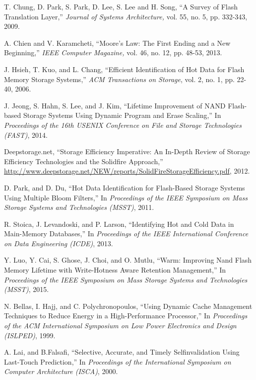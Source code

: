 \begin{thebibliography}{00}
T. Chung, D. Park, S. Park, D. Lee, S. Lee and H. Song,
``A Survey of Flash Translation Layer,''
\emph{Journal of Systems Architecture,} vol. 55, no. 5, pp. 332-343, 2009.

A. Chien and V. Karamcheti,
``Moore's Law: The First Ending and a New Beginning,''
\emph{IEEE Computer Magazine,} vol. 46, no. 12, pp. 48-53, 2013.

J. Hsieh, T. Kuo, and L. Chang,
``Efficient Identification of Hot Data for Flash Memory Storage Systems,''
\textit{ACM Transactions on Storage}, vol. 2, no. 1, pp. 22-40, 2006.

J. Jeong, S. Hahn, S. Lee, and J. Kim,
``Lifetime Improvement of NAND Flash-based Storage Systems Using Dynamic Program and Erase Scaling,''
In \emph{Proceedings of the 16th USENIX Conference on File and Storage Technologies (FAST)}, 2014.

Deepstorage.net,
``Storage Efficiency Imperative: An In-Depth Review of Storage Efficiency Technologies
and the Solidfire Approach,''
\url{http://www.deepstorage.net/NEW/reports/SolidFireStorageEfficiency.pdf}, 2012.

D. Park, and D. Du,
``Hot Data Identification for Flash-Based Storage Systems Using Multiple Bloom Filters,''
In \textit{Proceedings of the IEEE Symposium on Mass Storage Systems and Technologies (MSST)}, 2011.

R. Stoica, J. Levandoski, and P. Larson,
``Identifying Hot and Cold Data in Main-Memory Databases,''
In \textit{Proceedings of the IEEE International Conference on Data Engineering (ICDE)}, 2013.

Y. Luo, Y. Cai, S. Ghose, J. Choi, and O. Mutlu,
``Warm: Improving Nand Flash Memory Lifetime with Write-Hotness Aware Retention Management,''
In \textit{Proceedings of the IEEE Symposium on Mass Storage Systems and Technologies (MSST)}, 2015.

N. Bellas, I. Hajj, and C. Polychronopoulos,
``Using Dynamic Cache Management Techniques to Reduce Energy in a High-Performance Processor,''
In \textit{Proceedings of the ACM International Symposium on Low Power Electronics and Design (ISLPED)}, 1999.

A. Lai, and B.Falsafi,
``Selective, Accurate, and Timely Selfinvalidation Using Last-Touch Prediction,''
In \textit{Proceedings of the International Symposium on Computer Architecture (ISCA)}, 2000.


\end{thebibliography}
